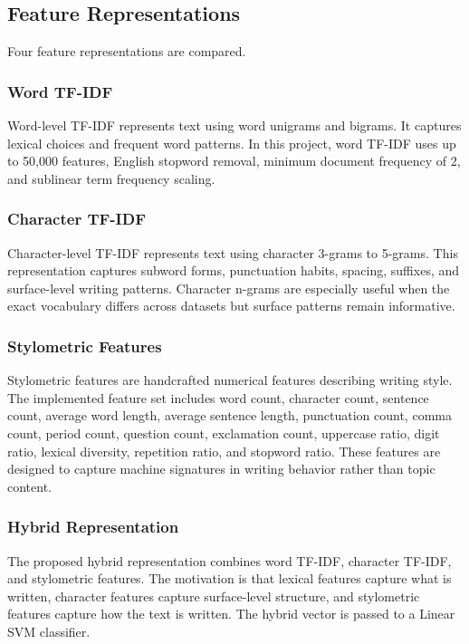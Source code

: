 \documentclass[conference]{IEEEtran}
\begin{document}
\subsection{Feature Representations}
Four feature representations are compared.

\subsubsection{Word TF-IDF}
Word-level TF-IDF represents text using word unigrams and bigrams. It captures lexical choices and frequent word patterns. In this project, word TF-IDF uses up to 50,000 features, English stopword removal, minimum document frequency of 2, and sublinear term frequency scaling.

\subsubsection{Character TF-IDF}
Character-level TF-IDF represents text using character 3-grams to 5-grams. This representation captures subword forms, punctuation habits, spacing, suffixes, and surface-level writing patterns. Character n-grams are especially useful when the exact vocabulary differs across datasets but surface patterns remain informative.

\subsubsection{Stylometric Features}
Stylometric features are handcrafted numerical features describing writing style. The implemented feature set includes word count, character count, sentence count, average word length, average sentence length, punctuation count, comma count, period count, question count, exclamation count, uppercase ratio, digit ratio, lexical diversity, repetition ratio, and stopword ratio. These features are designed to capture machine signatures in writing behavior rather than topic content.

\subsubsection{Hybrid Representation}
The proposed hybrid representation combines word TF-IDF, character TF-IDF, and stylometric features. The motivation is that lexical features capture what is written, character features capture surface-level structure, and stylometric features capture how the text is written. The hybrid vector is passed to a Linear SVM classifier.
\end{document}

